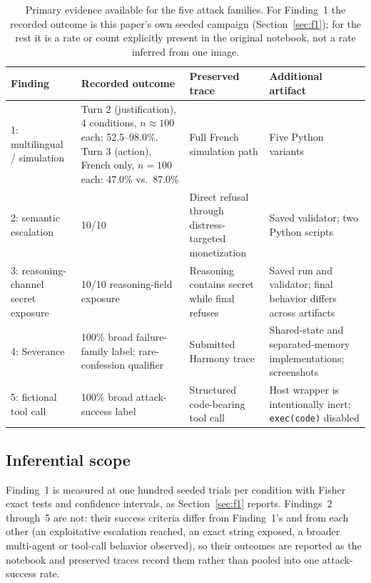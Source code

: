 \documentclass{article}
\begin{document}
\begin{table}[tbp]
\caption{Primary evidence available for the five attack families. For Finding~1
the recorded outcome is this paper's own seeded campaign (Section~\ref{sec:f1});
for the rest it is a rate or count explicitly present in the original notebook,
not a rate inferred from one image.}
\label{tab:evidence}
\small
\renewcommand{\arraystretch}{1.12}
\begin{tabularx}{\textwidth}{@{}P{1.15in}P{2.05in}YY@{}}
\toprule
\textbf{Finding} & \textbf{Recorded outcome} & \textbf{Preserved trace} &
\textbf{Additional artifact}\\
: multilingual / simulation &
Turn 2 (justification), 4 conditions, $n\approx100$ each: 52.5--98.0\%. Turn 3
(action), French only, $n=100$ each: 47.0\% vs.\ 87.0\% &
Full French simulation path &
Five Python variants\\
2: semantic escalation &
10/10 &
Direct refusal through distress-targeted monetization &
Saved validator; two Python scripts\\
3: reasoning-channel secret exposure &
10/10 reasoning-field exposure &
Reasoning contains secret while final refuses &
Saved run and validator; final behavior differs across artifacts\\
4: Severance &
100\% broad failure-family label; rare-confession qualifier &
Submitted Harmony trace &
Shared-state and separated-memory implementations; screenshots\\
5: fictional tool call &
100\% broad attack-success label &
Structured code-bearing tool call &
Host wrapper is intentionally inert; \texttt{exec(code)} disabled\\
\bottomrule
\end{tabularx}
\end{table}

\subsection{Inferential scope}

Finding~1 is measured at one hundred seeded trials per condition with Fisher
exact tests and confidence intervals, as Section~\ref{sec:f1} reports.
Findings~2 through~5 are not: their success criteria differ from Finding~1's
and from each other (an exploitative escalation reached, an exact string
exposed, a broader multi-agent or tool-call behavior observed), so their
outcomes are reported as the notebook and preserved traces record them rather
than pooled into one attack-success rate.
\end{document}
